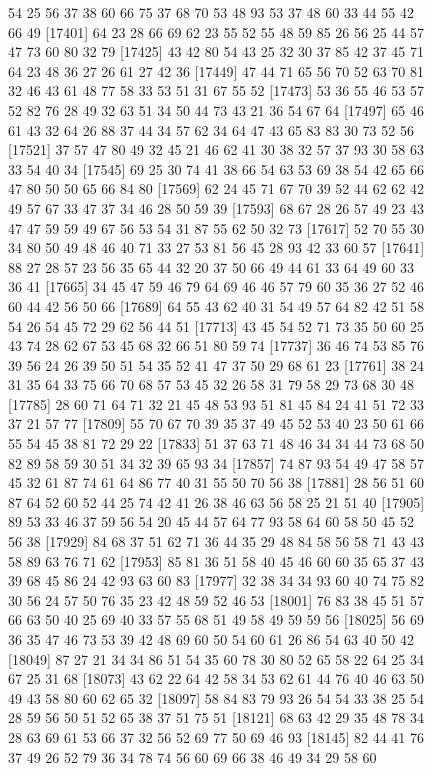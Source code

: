 \documentclass{article}
\begin{document}
\begin{figure}[H]
\begin{Schunk}
\begin{Soutput}
[17377] 54 25 56 37 38 60 66 75 37 68 70 53 48 93 53 37 48 60 33 44 55 42 66 49
[17401] 64 23 28 66 69 62 23 55 52 55 48 59 85 26 56 25 44 57 47 73 60 80 32 79
[17425] 43 42 80 54 43 25 32 30 37 85 42 37 45 71 64 23 48 36 27 26 61 27 42 36
[17449] 47 44 71 65 56 70 52 63 70 81 32 46 43 61 48 77 58 33 53 51 31 67 55 52
[17473] 53 36 55 46 53 57 52 82 76 28 49 32 63 51 34 50 44 73 43 21 36 54 67 64
[17497] 65 46 61 43 32 64 26 88 37 44 34 57 62 34 64 47 43 65 83 83 30 73 52 56
[17521] 37 57 47 80 49 32 45 21 46 62 41 30 38 32 57 37 93 30 58 63 33 54 40 34
[17545] 69 25 30 74 41 38 66 54 63 53 69 38 54 42 65 66 47 80 50 50 65 66 84 80
[17569] 62 24 45 71 67 70 39 52 44 62 62 42 49 57 67 33 47 37 34 46 28 50 59 39
[17593] 68 67 28 26 57 49 23 43 47 47 59 59 49 67 56 53 54 31 87 55 62 50 32 73
[17617] 52 70 55 30 34 80 50 49 48 46 40 71 33 27 53 81 56 45 28 93 42 33 60 57
[17641] 88 27 28 57 23 56 35 65 44 32 20 37 50 66 49 44 61 33 64 49 60 33 36 41
[17665] 34 45 47 59 46 79 64 69 46 46 57 79 60 35 36 27 52 46 60 44 42 56 50 66
[17689] 64 55 43 62 40 31 54 49 57 64 82 42 51 58 54 26 54 45 72 29 62 56 44 51
[17713] 43 45 54 52 71 73 35 50 60 25 43 74 28 62 67 53 45 68 32 66 51 80 59 74
[17737] 36 46 74 53 85 76 39 56 24 26 39 50 51 54 35 52 41 47 37 50 29 68 61 23
[17761] 38 24 31 35 64 33 75 66 70 68 57 53 45 32 26 58 31 79 58 29 73 68 30 48
[17785] 28 60 71 64 71 32 21 45 48 53 93 51 81 45 84 24 41 51 72 33 37 21 57 77
[17809] 55 70 67 70 39 35 37 49 45 52 53 40 23 50 61 66 55 54 45 38 81 72 29 22
[17833] 51 37 63 71 48 46 34 34 44 73 68 50 82 89 58 59 30 51 34 32 39 65 93 34
[17857] 74 87 93 54 49 47 58 57 45 32 61 87 74 61 64 86 77 40 31 55 50 70 56 38
[17881] 28 56 51 60 87 64 52 60 52 44 25 74 42 41 26 38 46 63 56 58 25 21 51 40
[17905] 89 53 33 46 37 59 56 54 20 45 44 57 64 77 93 58 64 60 58 50 45 52 56 38
[17929] 84 68 37 51 62 71 36 44 35 29 48 84 58 56 58 71 43 43 58 89 63 76 71 62
[17953] 85 81 36 51 58 40 45 46 60 60 35 65 37 43 39 68 45 86 24 42 93 63 60 83
[17977] 32 38 34 34 93 60 40 74 75 82 30 56 24 57 50 76 35 23 42 48 59 52 46 53
[18001] 76 83 38 45 51 57 66 63 50 40 25 69 40 33 57 55 68 51 49 58 49 59 59 56
[18025] 56 69 36 35 47 46 73 53 39 42 48 69 60 50 54 60 61 26 86 54 63 40 50 42
[18049] 87 27 21 34 34 86 51 54 35 60 78 30 80 52 65 58 22 64 25 34 67 25 31 68
[18073] 43 62 22 64 42 58 34 53 62 61 44 76 40 46 63 50 49 43 58 80 60 62 65 32
[18097] 58 84 83 79 93 26 54 54 33 38 25 54 28 59 56 50 51 52 65 38 37 51 75 51
[18121] 68 63 42 29 35 48 78 34 28 63 69 61 53 66 37 32 56 52 69 77 50 69 46 93
[18145] 82 44 41 76 37 49 26 52 79 36 34 78 74 56 60 69 66 38 46 49 34 29 58 60

\end{Soutput}
\end{Schunk}
\end{figure}
\end{document}
